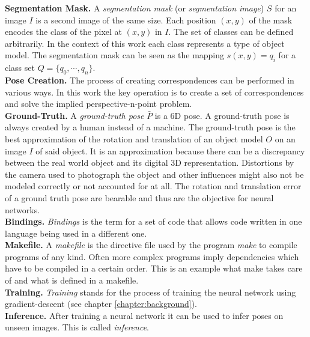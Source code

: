 \noindent\textbf{Segmentation Mask.} A \textit{segmentation mask} (or \textit{segmentation image}) $S$ for an image $I$ is a second image of the same size. Each position $(x, y)$ of the mask encodes the class of the pixel at $(x, y)$ in $I$. The set of classes can be defined arbitrarily. In the context of this work each class represents a type of object model. The segmentation mask can be seen as the mapping $s(x, y) = q_i$ for a class set $Q = \{q_0, \cdots, q_n\}$. \\

\noindent\textbf{Pose Creation.} The process of creating correspondences can be performed in various ways. In this work the key operation is to create a set of correspondences and solve the implied perspective-n-point problem. \\

\noindent\textbf{Ground-Truth.} A \textit{ground-truth pose} $\bar{P}$ is a 6D pose. A ground-truth pose is always created by a human instead of a machine. The ground-truth pose is the best approximation of the rotation and translation of an object model $O$ on an image $I$ of said object. It is an approximation because there can be a discrepancy between the real world object and its digital 3D representation. Distortions by the camera used to photograph the object and other influences might also not be modeled correctly or not accounted for at all. The rotation and translation error of a ground truth pose are bearable and thus are the objective for neural networks. \\

\noindent\textbf{Bindings.} \textit{Bindings} is the term for a set of code that allows code written in one language being used in a different one. \\

\noindent\textbf{Makefile.} A \textit{makefile} is the directive file used by the program \textit{make} to compile programs of any kind. Often more complex programs imply dependencies which have to be compiled in a certain order. This is an example what make takes care of and what is defined in a makefile. \\

\noindent\textbf{Training.} \textit{Training} stands for the process of training the neural network using gradient-descent (see chapter \ref{chapter:background}). \\

\noindent\textbf{Inference.} After training a neural network it can be used to infer poses on unseen images. This is called \textit{inference}.

